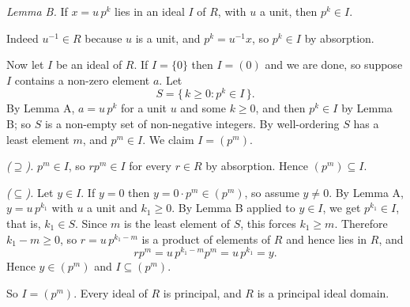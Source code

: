 \documentclass[11pt]{article}
\begin{document}
\begin{solution}
  \emph{Lemma B.} If $x = u\,p^{k}$ lies in an ideal $I$ of $R$, with $u$ a
  unit, then $p^{k} \in I$.

  Indeed $u^{-1} \in R$ because $u$ is a unit, and $p^{k} = u^{-1}x$, so
  $p^{k} \in I$ by absorption.

  Now let $I$ be an ideal of $R$. If $I = \{0\}$ then $I = (0)$ and we are
  done, so suppose $I$ contains a non-zero element $a$. Let
  \[
    S = \{\, k \geq 0 : p^{k} \in I \,\} .
  \]
  By Lemma A, $a = u\,p^{k}$ for a unit $u$ and some $k \geq 0$, and then
  $p^{k} \in I$ by Lemma B; so $S$ is a non-empty set of non-negative
  integers. By well-ordering $S$ has a least element $m$, and $p^{m} \in I$.
  We claim $I = (p^{m})$.

  \emph{($\supseteq$).} $p^{m} \in I$, so $rp^{m} \in I$ for every $r \in R$
  by absorption. Hence $(p^{m}) \subseteq I$.

  \emph{($\subseteq$).} Let $y \in I$. If $y = 0$ then $y = 0 \cdot p^{m} \in
  (p^{m})$, so assume $y \neq 0$. By Lemma A, $y = u\,p^{k_{1}}$ with $u$ a
  unit and $k_{1} \geq 0$. By Lemma B applied to $y \in I$, we get
  $p^{k_{1}} \in I$, that is, $k_{1} \in S$. Since $m$ is the least element of
  $S$, this forces $k_{1} \geq m$. Therefore $k_{1} - m \geq 0$, so
  $r = u\,p^{k_{1}-m}$ is a product of elements of $R$ and hence lies in $R$,
  and
  \[
    r p^{m} = u\,p^{k_{1}-m}p^{m} = u\,p^{k_{1}} = y .
  \]
  Hence $y \in (p^{m})$ and $I \subseteq (p^{m})$.

  So $I = (p^{m})$. Every ideal of $R$ is principal, and $R$ is a principal
  ideal domain.
\end{solution}
\end{document}
